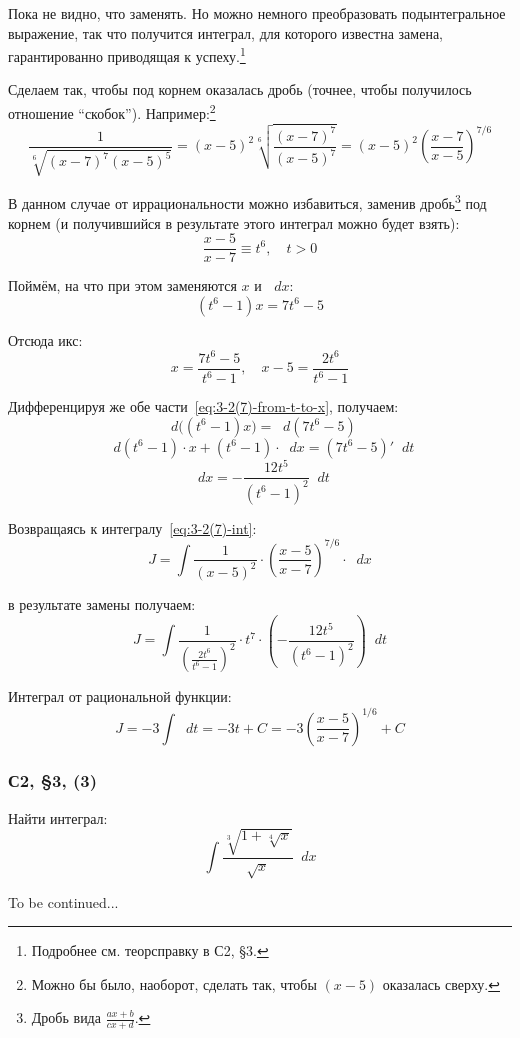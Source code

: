 \documentclass[a4paper,12pt]{article}
\newcommand{\diff}{\mathop{}\!d}
\begin{document}
  \begin{solution}
    Пока не видно, что заменять.
    Но можно немного преобразовать подынтегральное выражение, так что получится интеграл, для которого известна замена, гарантированно приводящая к успеху.\footnote{
      Подробнее см. теорсправку в С2, \S 3.
    }

    Сделаем так, чтобы под корнем оказалась дробь (точнее, чтобы получилось отношение ``скобок'').
    Например:\footnote{
      Можно бы было, наоборот, сделать так, чтобы $(x - 5)$ оказалась сверху.
    }
    \[
      \frac{1}{\sqrt[6]{(x - 7)^7 (x - 5)^5}} = (x - 5)^2 \sqrt[6]{\frac{(x - 7)^7}{(x - 5)^7}} = (x - 5)^2 \left(\frac{x - 7}{x - 5}\right)^{7/6}
    \]

    В данном случае от иррациональности можно избавиться, заменив дробь\footnote{
      Дробь вида $\frac{ax + b}{cx + d}$.
    } под корнем (и получившийся в результате этого интеграл можно будет взять):
    \[
      \frac{x - 5}{x - 7} \equiv t^6,\quad t > 0
    \]

    Поймём, на что при этом заменяются $x$ и $\diff x$:
    \begin{equation}\label{eq:3-2(7)-from-t-to-x}
      (t^6 - 1) x = 7t^6 - 5
    \end{equation}

    Отсюда икс:
    \[
      \boxed{x = \frac{7t^6 - 5}{t^6 - 1}},\quad x - 5 = \frac{2t^6}{t^6 - 1}
    \]

    Дифференцируя же обе части~\eqref{eq:3-2(7)-from-t-to-x}, получаем:
    \[
      \diff \bigl((t^6 - 1) x\bigr) = \diff(7t^6 - 5)
    \]
    \[
      \diff(t^6 - 1) \cdot x + (t^6 - 1) \cdot \diff x = (7t^6 - 5)' \diff t
    \]
    \[
      \boxed{\diff x = -\frac{12t^5}{(t^6 - 1)^2} \diff t}
    \]

    Возвращаясь к интегралу~\eqref{eq:3-2(7)-int}:
    \[
      J = \int \frac{1}{(x - 5)^2} \cdot \left(\frac{x - 5}{x - 7}\right)^{7/6} \cdot \diff x
    \]

    в результате замены получаем:
    \[
      J = \int \frac{1}{\left(\frac{2t^6}{t^6 - 1}\right)^2} \cdot t^7 \cdot \left(-\frac{12t^5}{(t^6 - 1)^2}\right) \diff t
    \]

    Интеграл от рациональной функции:
    \[
      J = -3 \int \diff t = -3t + C = -3 \left(\frac{x - 5}{x - 7}\right)^{1/6} + C
    \]
  \end{solution}


  \subsubsection{С2, \S 3, (3)}

  Найти интеграл:
  \[
    \int \frac{
      \sqrt[3]{1 + \sqrt[4]{x}}
    }{
      \sqrt{x}
    } \diff x
  \]
  
  \begin{solution}
    To be continued...
  \end{solution}
\end{document}
